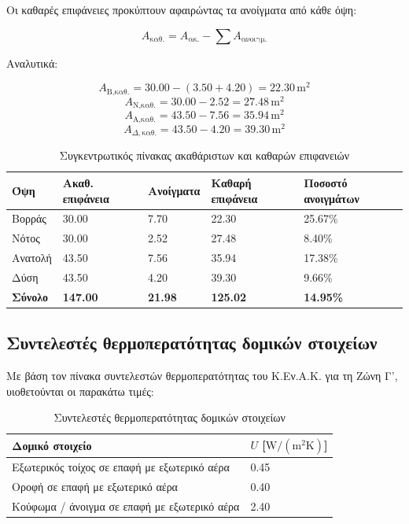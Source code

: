 \documentclass[12pt,a4paper]{article}
\begin{document}
Οι καθαρές επιφάνειες προκύπτουν αφαιρώντας τα ανοίγματα από κάθε όψη:

\[
A_{\text{καθ.}} = A_{\text{ακ.}} - \sum A_{\text{ανοιγμ.}}
\]

Αναλυτικά:

\[
A_{\text{Β,καθ.}} = 30.00 - (3.50 + 4.20) = 22.30\,\mathrm{m^2}
\]
\[
A_{\text{Ν,καθ.}} = 30.00 - 2.52 = 27.48\,\mathrm{m^2}
\]
\[
A_{\text{Α,καθ.}} = 43.50 - 7.56 = 35.94\,\mathrm{m^2}
\]
\[
A_{\Delta,\text{καθ.}} = 43.50 - 4.20 = 39.30\,\mathrm{m^2}
\]

\begin{table}[H]
\centering
\small
\caption{Συγκεντρωτικός πίνακας ακαθάριστων και καθαρών επιφανειών}
\begin{tabularx}{\textwidth}{L C{2.4cm} C{2.4cm} C{2.4cm} C{2.4cm}}
\toprule
\textbf{Όψη} & \textbf{Ακαθ. επιφάνεια} & \textbf{Ανοίγματα} & \textbf{Καθαρή επιφάνεια} & \textbf{Ποσοστό ανοιγμάτων} \\
\midrule
Βορράς & 30.00 & 7.70 & 22.30 & 25.67\% \\
Νότος & 30.00 & 2.52 & 27.48 & 8.40\% \\
Ανατολή & 43.50 & 7.56 & 35.94 & 17.38\% \\
Δύση & 43.50 & 4.20 & 39.30 & 9.66\% \\
\midrule
\textbf{Σύνολο} & \textbf{147.00} & \textbf{21.98} & \textbf{125.02} & \textbf{14.95\%} \\
\bottomrule
\end{tabularx}
\end{table}

\subsection{Συντελεστές θερμοπερατότητας δομικών στοιχείων}

Με βάση τον πίνακα συντελεστών θερμοπερατότητας του Κ.Εν.Α.Κ. για τη Ζώνη Γ',
υιοθετούνται οι παρακάτω τιμές:

\begin{table}[H]
\centering
\caption{Συντελεστές θερμοπερατότητας δομικών στοιχείων}
\begin{tabularx}{\textwidth}{L C{3.4cm}}
\toprule
\textbf{Δομικό στοιχείο} & \textbf{\(U\) [\(\mathrm{W/(m^2K)}\)]} \\
\midrule
Εξωτερικός τοίχος σε επαφή με εξωτερικό αέρα & 0.45 \\
Οροφή σε επαφή με εξωτερικό αέρα & 0.40 \\
Κούφωμα / άνοιγμα σε επαφή με εξωτερικό αέρα & 2.40 \\
\bottomrule
\end{tabularx}
\end{table}
\end{document}
